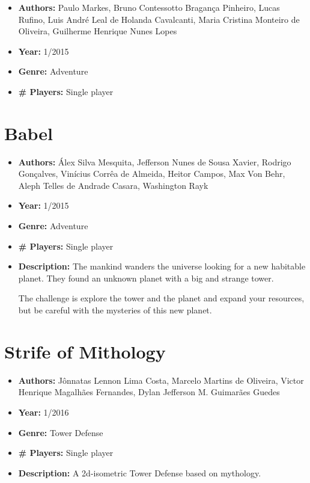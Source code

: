 \begin{apendicesenv}
\begin{itemize}
\item[] \textbf{Authors:} Paulo Markes, Bruno Contessotto Bragança Pinheiro, Lucas Rufino, Luis André Leal de Holanda Cavalcanti, Maria Cristina Monteiro de Oliveira, Guilherme Henrique Nunes Lopes
\item[] \textbf{Year:} 1/2015
\item[] \textbf{Genre:} Adventure
\item[] \textbf{\# Players:} Single player
\end{itemize}


\section{Babel}
\label {sec:babel}

\begin{itemize}
\item[] \textbf{Authors:} Álex Silva Mesquita, Jefferson Nunes de Sousa Xavier, Rodrigo Gonçalves, Vinícius Corrêa de Almeida, Heitor Campos, Max Von Behr, Aleph Telles de Andrade Casara, Washington Rayk
\item[] \textbf{Year:} 1/2015
\item[] \textbf{Genre:} Adventure
\item[] \textbf{\# Players:} Single player
\item[] \textbf{Description:} The mankind wanders the universe looking for a new habitable planet. They found an unknown planet with a big and strange tower.

The challenge is explore the tower and the planet and expand your resources, but be careful with the mysteries of this new planet.
\end{itemize}

\section{Strife of Mithology}
\label {sec:strife}

\begin{itemize}
\item[] \textbf{Authors:} Jônnatas Lennon Lima Costa, Marcelo Martins de Oliveira, Victor Henrique Magalhães Fernandes, Dylan Jefferson M. Guimarães Guedes
\item[] \textbf{Year:} 1/2016
\item[] \textbf{Genre:} Tower Defense
\item[] \textbf{\# Players:} Single player
\item[] \textbf{Description:} A 2d-isometric Tower Defense based on mythology.
\end{itemize}


\end{apendicesenv}

